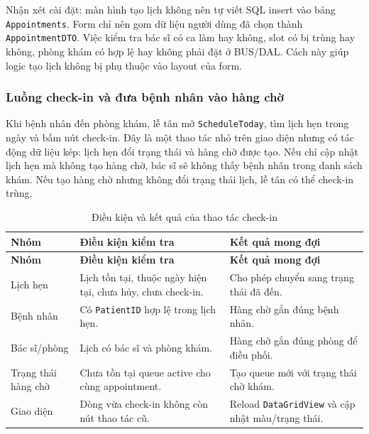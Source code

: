 \documentclass[12pt,a4paper]{article}
\numberwithin{figure}{subsection}
\numberwithin{table}{subsection}
\begin{document}
Nhận xét cài đặt: màn hình tạo lịch không nên tự viết SQL insert vào bảng \texttt{Appointments}. Form chỉ nên gom dữ liệu người dùng đã chọn thành \texttt{AppointmentDTO}. Việc kiểm tra bác sĩ có ca làm hay không, slot có bị trùng hay không, phòng khám có hợp lệ hay không phải đặt ở BUS/DAL. Cách này giúp logic tạo lịch không bị phụ thuộc vào layout của form.

\subsubsection{Luồng check-in và đưa bệnh nhân vào hàng chờ}

Khi bệnh nhân đến phòng khám, lễ tân mở \texttt{ScheduleToday}, tìm lịch hẹn trong ngày và bấm nút check-in. Đây là một thao tác nhỏ trên giao diện nhưng có tác động dữ liệu kép: lịch hẹn đổi trạng thái và hàng chờ được tạo. Nếu chỉ cập nhật lịch hẹn mà không tạo hàng chờ, bác sĩ sẽ không thấy bệnh nhân trong danh sách khám. Nếu tạo hàng chờ nhưng không đổi trạng thái lịch, lễ tân có thể check-in trùng.

\begin{longtable}{|p{3cm}|p{5cm}|p{5.2cm}|}
\caption{Điều kiện và kết quả của thao tác check-in} \\
\hline
\textbf{Nhóm} & \textbf{Điều kiện kiểm tra} & \textbf{Kết quả mong đợi} \\
\hline
\endfirsthead
\hline
\textbf{Nhóm} & \textbf{Điều kiện kiểm tra} & \textbf{Kết quả mong đợi} \\
\hline
\endhead
Lịch hẹn & Lịch tồn tại, thuộc ngày hiện tại, chưa hủy, chưa check-in. & Cho phép chuyển sang trạng thái đã đến. \\
\hline
Bệnh nhân & Có \texttt{PatientID} hợp lệ trong lịch hẹn. & Hàng chờ gắn đúng bệnh nhân. \\
\hline
Bác sĩ/phòng & Lịch có bác sĩ và phòng khám. & Hàng chờ gắn đúng phòng để điều phối. \\
\hline
Trạng thái hàng chờ & Chưa tồn tại queue active cho cùng appointment. & Tạo queue mới với trạng thái chờ khám. \\
\hline
Giao diện & Dòng vừa check-in không còn nút thao tác cũ. & Reload \texttt{DataGridView} và cập nhật màu/trạng thái. \\
\hline
\end{longtable}
\end{document}
